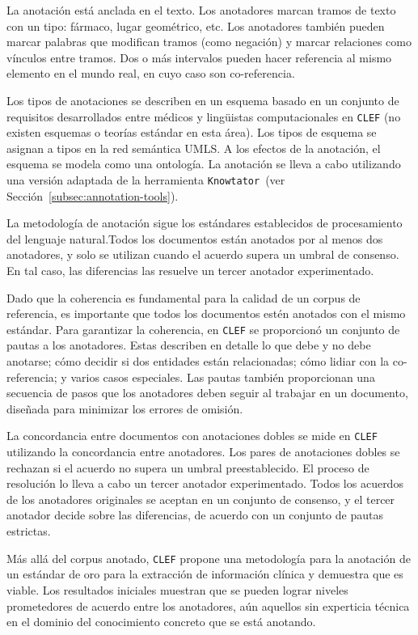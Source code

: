 La anotación está anclada en el texto.
Los anotadores marcan tramos de texto con un tipo: fármaco, lugar geométrico, etc.
Los anotadores también pueden marcar palabras que modifican tramos (como negación) y marcar relaciones como vínculos entre tramos.
Dos o más intervalos pueden hacer referencia al mismo elemento en el mundo real, en cuyo caso son co-referencia.

Los tipos de anotaciones se describen en un esquema basado en un conjunto de requisitos desarrollados entre médicos y lingüistas computacionales en \texttt{CLEF} (no existen esquemas o teorías estándar en esta área).
Los tipos de esquema se asignan a tipos en la red semántica UMLS.
A los efectos de la anotación, el esquema se modela como una ontología.
La anotación se lleva a cabo utilizando una versión adaptada de la herramienta \texttt{Knowtator}~(ver Sección~\ref{subsec:annotation-tools}).

La metodología de anotación sigue los estándares establecidos de procesamiento del lenguaje natural.Todos los documentos están anotados por al menos dos anotadores, y solo se utilizan cuando el acuerdo supera un umbral de consenso.
En tal caso, las diferencias las resuelve un tercer anotador experimentado.

Dado que la coherencia es fundamental para la calidad de un corpus de referencia, es importante que todos los documentos estén anotados con el mismo estándar.
Para garantizar la coherencia, en \texttt{CLEF} se proporcionó un conjunto de pautas a los anotadores.
Estas describen en detalle lo que debe y no debe anotarse; cómo decidir si dos entidades están relacionadas; cómo lidiar con la co-referencia; y varios casos especiales.
Las pautas también proporcionan una secuencia de pasos que los anotadores deben seguir al trabajar en un documento, diseñada para minimizar los errores de omisión.

La concordancia entre documentos con anotaciones dobles se mide en \texttt{CLEF} utilizando la concordancia entre anotadores.
Los pares de anotaciones dobles se rechazan si el acuerdo no supera un umbral  preestablecido.
El proceso de resolución lo lleva a cabo un tercer anotador experimentado.
Todos los acuerdos de los anotadores originales se aceptan en un conjunto de consenso, y el tercer anotador decide sobre las diferencias, de acuerdo con un conjunto de pautas estrictas.

Más allá del corpus anotado, \texttt{CLEF} propone una metodología para la anotación de un estándar de oro para la extracción de información clínica y demuestra que es viable.
Los resultados iniciales muestran que se pueden lograr niveles prometedores de acuerdo entre los anotadores, aún aquellos sin experticia técnica en el dominio del conocimiento concreto que se está anotando.

